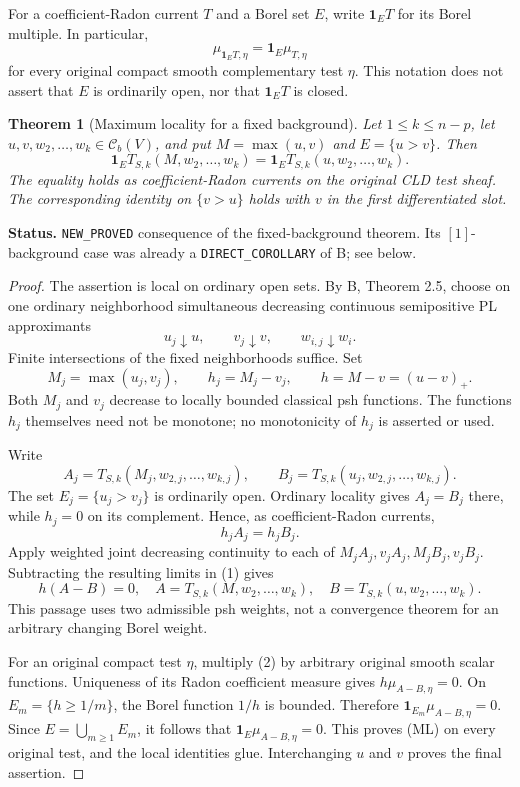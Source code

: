 \documentclass[11pt,a4paper]{article}
\numberwithin{equation}{section}
\newtheorem{theorem}{Theorem}[section]
\theoremstyle{definition}
\theoremstyle{remark}
\begin{document}
For a coefficient-Radon current \(T\) and a Borel set \(E\), write
\(\mathbf 1_E T\) for its Borel multiple. In particular,
\[
 \mu_{\mathbf 1_E T,\eta}=\mathbf 1_E\mu_{T,\eta}
\]
for every original compact smooth complementary test \(\eta\). This notation
does not assert that \(E\) is ordinarily open, nor that \(\mathbf 1_E T\) is
closed.

\begin{theorem}[Maximum locality for a fixed background]
\label{thm:maximum-locality-relative}
Let \(1\leq k\leq n-p\), let \(u,v,w_2,\ldots,w_k\in\mathcal C_b(V)\), and
put \(M=\max(u,v)\) and \(E=\{u>v\}\). Then
\[
 \mathbf 1_E T_{S,k}(M,w_2,\ldots,w_k)
 =\mathbf 1_E T_{S,k}(u,w_2,\ldots,w_k).
\tag{ML}
\]
The equality holds as coefficient-Radon currents on the original CLD test
sheaf. The corresponding identity on \(\{v>u\}\) holds with \(v\) in the
first differentiated slot.
\end{theorem}

\noindent\textbf{Status.} \texttt{NEW\_PROVED} consequence of the
fixed-background theorem. Its \([1]\)-background case was already
a \texttt{DIRECT\_COROLLARY} of B; see below.

\begin{proof}
The assertion is local on ordinary open sets. By B, Theorem 2.5, choose on one
ordinary neighborhood simultaneous decreasing continuous semipositive PL
approximants
\[
 u_j\downarrow u,\qquad v_j\downarrow v,\qquad w_{i,j}\downarrow w_i.
\]
Finite intersections of the fixed neighborhoods suffice. Set
\[
 M_j=\max(u_j,v_j),\qquad h_j=M_j-v_j,
 \qquad h=M-v=(u-v)_+.
\]
Both \(M_j\) and \(v_j\) decrease to locally bounded classical psh functions.
The functions \(h_j\) themselves need not be monotone; no monotonicity of
\(h_j\) is asserted or used.

Write
\[
 A_j=T_{S,k}(M_j,w_{2,j},\ldots,w_{k,j}),\qquad
 B_j=T_{S,k}(u_j,w_{2,j},\ldots,w_{k,j}).
\]
The set \(E_j=\{u_j>v_j\}\) is ordinarily open. Ordinary locality gives
\(A_j=B_j\) there, while \(h_j=0\) on its complement. Hence, as
coefficient-Radon currents,
\[
 h_j A_j=h_j B_j.
\tag{1}
\]
Apply weighted joint decreasing continuity to each of
\(M_j A_j,v_j A_j,M_j B_j,v_j B_j\). Subtracting the resulting limits in
(1) gives
\[
 h(A-B)=0,
 \quad A=T_{S,k}(M,w_2,\ldots,w_k),\quad
 B=T_{S,k}(u,w_2,\ldots,w_k).
\tag{2}
\]
This passage uses two admissible psh weights, not a convergence theorem for
an arbitrary changing Borel weight.

For an original compact test \(\eta\), multiply (2) by arbitrary original
smooth scalar functions. Uniqueness of its Radon coefficient measure gives
\(h\mu_{A-B,\eta}=0\). On \(E_m=\{h\geq 1/m\}\), the Borel function
\(1/h\) is bounded. Therefore
\(\mathbf 1_{E_m}\mu_{A-B,\eta}=0\). Since
\(E=\bigcup_{m\geq1}E_m\), it follows that
\(\mathbf 1_E\mu_{A-B,\eta}=0\). This proves (ML) on every original
test, and the local identities glue. Interchanging \(u\) and \(v\) proves
the final assertion.
\end{proof}
\end{document}
